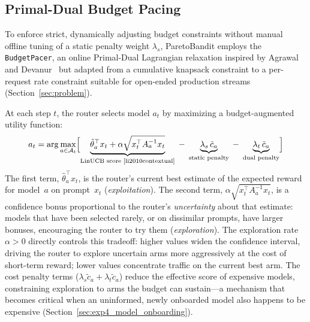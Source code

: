 \subsection{Primal-Dual Budget Pacing}
\label{sec:budget_pacing}

To enforce strict, dynamically adjusting budget constraints without manual offline tuning of a static penalty weight $\lambda_s$, ParetoBandit employs the \texttt{BudgetPacer}, an online Primal-Dual Lagrangian relaxation inspired by Agrawal and Devanur~\cite{agrawal2014bandits} but adapted from a cumulative knapsack constraint to a per-request rate constraint suitable for open-ended production streams (Section~\ref{sec:problem}).

At each step $t$, the router selects model $a_t$ by maximizing a budget-augmented utility function:
\begin{equation}
    a_t = \arg\max_{a \in \mathcal{A}_t} \Bigl[
        \underbrace{\hat\theta_a^\top x_t + \alpha \sqrt{x_t^\top A_a^{-1} x_t}}_{\text{LinUCB score~\cite{li2010contextual}}}
        \;-\; \underbrace{\lambda_s \,\tilde{c}_a}_{\text{static penalty}}
        \;-\; \underbrace{\lambda_t \,\tilde{c}_a}_{\text{dual penalty}}
    \Bigr]
    \label{eq:budget_ucb}
\end{equation}
The first term, $\hat\theta_a^\top x_t$, is the router's current best estimate of the expected reward for model~$a$ on prompt~$x_t$ (\emph{exploitation}).  The second term, $\alpha \sqrt{x_t^\top A_a^{-1} x_t}$, is a confidence bonus proportional to the router's \emph{uncertainty} about that estimate: models that have been selected rarely, or on dissimilar prompts, have larger bonuses, encouraging the router to try them (\emph{exploration}).
The exploration rate $\alpha > 0$ directly controls this tradeoff: higher values widen the confidence interval, driving the router to explore uncertain arms more aggressively at the cost of short-term reward; lower values concentrate traffic on the current best arm.
The cost penalty terms ($\lambda_s\tilde{c}_a + \lambda_t\tilde{c}_a$) reduce the effective score of expensive models, constraining exploration to arms the budget can sustain---a mechanism that becomes critical when an uninformed, newly onboarded model also happens to be expensive (Section~\ref{sec:exp4_model_onboarding}).

